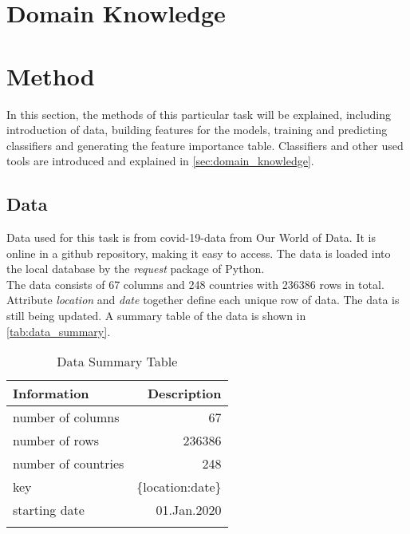 \documentclass[10pt, a4paper, twocolumn]{article} %
\begin{document}
\section{Domain Knowledge}\label{sec:domain_knowledge}

\section{Method}
In this section, the methods of this particular task will be explained, including introduction of data, building 
features for the models, training and predicting classifiers and generating the feature importance table. 
Classifiers and other used tools are introduced and explained in \autoref{sec:domain_knowledge}.
\subsection{Data}
Data used for this task is from covid-19-data from Our World of Data. It is online in a github repository, making 
it easy to access. The data is loaded into the local database by the \emph{request} package of Python.\\[10pt]
The data consists of 67 columns and 248 countries with 236386 rows in total. Attribute \emph{location} and 
\emph{date} together define each unique row of data. The data is still being updated. 
A summary table of the data is shown 
in \autoref{tab:data_summary}.
\begin{table}
	\caption{Data Summary Table}
	\centering
	\begin{tabular}{lr}
		\toprule
		\textbf{Information} & \textbf{Description} \\
		\midrule
		number of columns & 67 \\
		number of rows & 236386 \\
		number of countries & 248 \\
		key & \{location:date\}\\
		starting date & 01.Jan.2020\\
		\bottomrule
	\label{tab:data_summary}
	\end{tabular}
\end{table}
\end{document}

